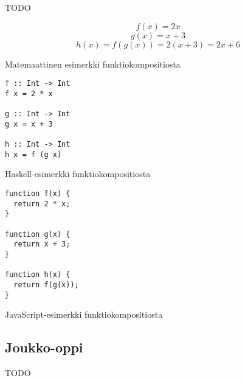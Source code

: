 TODO

\begin{code}
  \begin{equation}
    f(x) = 2x
  \end{equation}
  \begin{equation}
    g(x) = x + 3
  \end{equation}
  \begin{equation}
    h(x) = f(g(x)) = 2(x + 3) = 2x + 6
  \end{equation}
  \caption{Matemaattinen esimerkki funktiokompositiosta}
  \label{equation:composition}
\end{code}
\bigskip

\begin{code}
  \begin{verbatim}
f :: Int -> Int
f x = 2 * x

g :: Int -> Int
g x = x + 3

h :: Int -> Int
h x = f (g x)
\end{verbatim}
  \caption{Haskell-esimerkki funktiokompositiosta}
  \label{code:haskell_composition}
\end{code}
\bigskip
\begin{code}
  \begin{verbatim}
function f(x) {
  return 2 * x;
}

function g(x) {
  return x + 3;
}

function h(x) {
  return f(g(x));
}
\end{verbatim}
  \caption{JavaScript-esimerkki funktiokompositiosta}
  \label{code:javascript_composition}
\end{code}


\subsection{Joukko-oppi}

TODO

